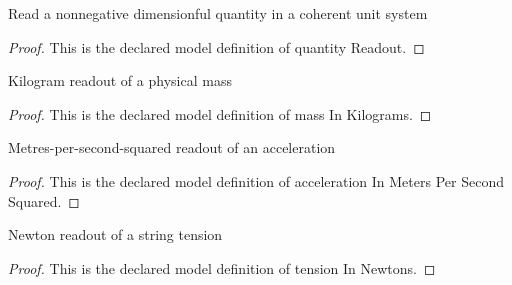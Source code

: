 \begin{definition}
  \label{def:physics:phyx-mini-0241:phyxminiproblems-problemphyxmini0241-quantityreadout}
  Read a nonnegative dimensionful quantity in a coherent unit system
\end{definition}
\begin{proof}
  This is the declared model definition of quantity Readout.
\end{proof}
\begin{definition}
  \label{def:physics:phyx-mini-0241:phyxminiproblems-problemphyxmini0241-massinkilograms}
  Kilogram readout of a physical mass
\end{definition}
\begin{proof}
  This is the declared model definition of mass In Kilograms.
\end{proof}
\begin{definition}
  \label{def:physics:phyx-mini-0241:phyxminiproblems-problemphyxmini0241-accelerationinmeterspersecondsquared}
  Metres-per-second-squared readout of an acceleration
\end{definition}
\begin{proof}
  This is the declared model definition of acceleration In Meters Per Second Squared.
\end{proof}
\begin{definition}
  \label{def:physics:phyx-mini-0241:phyxminiproblems-problemphyxmini0241-tensioninnewtons}
  Newton readout of a string tension
\end{definition}
\begin{proof}
  This is the declared model definition of tension In Newtons.
\end{proof}

